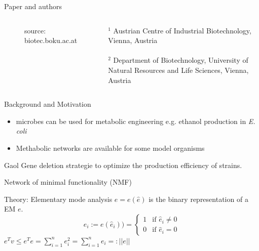 \documentclass{beamer}
\begin{document}
\begin{frame}{Paper and authors}
\begin{columns}
\begin{center}
\begin{figure}
         \tiny{source: biotec.boku.ac.at}
        \end{figure}
      \end{center}
    \tiny {$^{1}$ Austrian Centre of Industrial 
        Biotechnology, Vienna, Austria} 
    \\ ~ \\
    \tiny {$^{2}$ Department of Biotechnology, 
        University of Natural Resources and Life Sciences, 
        Vienna, Austria} 
 \end{columns}
\end{frame}

\begin{frame}{Background and Motivation}
    \begin{itemize}
        \item microbes can be used for metabolic engineering 
        e.g. ethanol production in \emph{E. coli}
        \item Methabolic networks are available for some model organisms
    \end{itemize}
    \begin{block}{Gaol}
        Gene deletion strategie to optimize the production 
        efficiency of strains.
    \end{block}
\end{frame}

\begin{frame}{Network of minimal functionality (NMF)}
    
\end{frame}


\begin{frame}{Theory: Elementary mode analysis}
    $e = e(\hat{e}) $ is the binary representation of a EM $e$.
    \begin{equation}
        e_{i} := e(\hat{e}_{i})) = 
        \begin{cases}
            1 & \text{if }  \hat{e}_{i} \neq 0 \\
            0 & \text{if }  \hat{e}_{i} = 0 
        \end{cases}
    \end{equation}
    $ e^{T}v \leq e^{T}e = \sum_{i=1}^{n} e_{i}^{2} = \sum_{i=1}^{n} e_{i} =: ||e||$

\end{frame}
\end{document}
